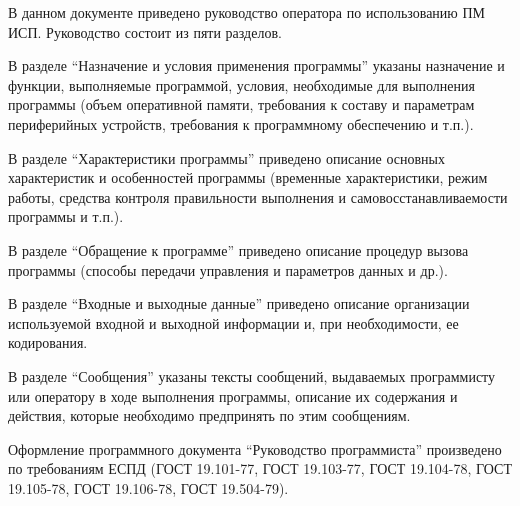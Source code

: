 \Annotation

В данном документе приведено руководство оператора по использованию ПМ ИСП.
Руководство состоит из пяти разделов.

В разделе ``Назначение и условия применения программы'' указаны назначение и функции, выполняемые программой, условия, необходимые для выполнения программы (объем оперативной памяти, требования к составу и параметрам периферийных устройств, требования к программному обеспечению и т.п.).

В разделе ``Характеристики программы'' приведено описание основных характеристик и особенностей программы (временные характеристики, режим работы, средства контроля правильности выполнения и самовосстанавливаемости программы и т.п.).

В разделе ``Обращение к программе'' приведено описание процедур вызова программы (способы передачи управления и параметров данных и др.).

В разделе ``Входные и выходные данные'' приведено описание организации используемой входной и выходной информации и, при необходимости, ее кодирования.

В разделе ``Сообщения'' указаны тексты сообщений, выдаваемых программисту или оператору в ходе выполнения программы, описание их содержания и действия, которые необходимо предпринять по этим сообщениям.

Оформление программного документа ``Руководство программиста'' произведено по требованиям ЕСПД (ГОСТ 19.101-77, ГОСТ 19.103-77, ГОСТ 19.104-78, ГОСТ 19.105-78, ГОСТ 19.106-78, ГОСТ 19.504-79).
